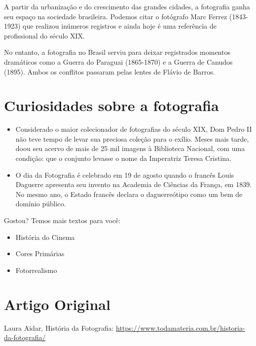 \documentclass{article}
\begin{document}
A partir da urbanização e do crescimento das grandes cidades, a fotografia ganha seu espaço na sociedade brasileira. Podemos citar o fotógrafo Marc Ferrez (1843-1923) que realizou inúmeros registros e ainda hoje é uma referência de profissional do século XIX.

No entanto, a fotografia no Brasil serviu para deixar registrados momentos dramáticos como a Guerra do Paraguai (1865-1870) e a Guerra de Canudos (1895). Ambos os conflitos passaram pelas lentes de Flávio de Barros.



\section{Curiosidades sobre a fotografia}

\begin{itemize}
\item{Considerado o maior colecionador de fotografias do século XIX, Dom Pedro II não teve tempo de levar sua preciosa coleção para o exílio. Meses mais tarde, doou seu acervo de mais de 25 mil imagens à Biblioteca Nacional, com uma condição: que o conjunto levasse o nome da Imperatriz Teresa Cristina.}
\item{O dia da Fotografia é celebrado em 19 de agosto quando o francês Louis Daguerre apresenta seu invento na Academia de Ciências da França, em 1839. No mesmo ano, o Estado francês declara o daguerreótipo como um bem de domínio público.}
\end{itemize}

Gostou? Temos mais textos para você:

\begin{itemize}
\item{História do Cinema}
\item{Cores Primárias}
\item{Fotorrealismo}
\end{itemize}




\section*{Artigo Original}
Laura Aidar, História da Fotografia: \url{https://www.todamateria.com.br/historia-da-fotografia/}
\end{document}
